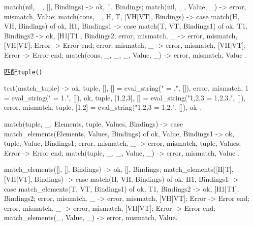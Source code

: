\documentclass[preview,multi,crop=false,border=1in,class=memoir]{standalone}
\begin{document}
\begin{preview-page}
\begin{SourceCode}
match({nil, _}, [], Bindings) ->
    {ok, [], Bindings};
match({nil, _}, Value, _) ->
    {error, {mismatch, Value}};
match({cons, _, H, T}, [VH|VT], Bindings) ->
    case match(H, VH, Bindings) of
        {ok, H1, Bindings1} ->
            case match(T, VT, Bindings1) of
                {ok, T1, Bindings2} ->
                    {ok, [H1|T1], Bindings2};
                {error, {mismatch, _}} ->
                    {error, {mismatch, [VH|VT]}};
                Error ->
                    Error
            end;
        {error, {mismatch, _}} ->
            {error, {mismatch, [VH|VT]}};
        Error ->
            Error
    end;
match({cons, _, _, _}, Value, _) ->
    {error, {mismatch, Value}}
.
\end{SourceCode}

匹配\verb|tuple()|

\begin{SourceCode}
test(match_tuple) ->
    {ok, {tuple, []}, []} = eval_string("{} = {}.", []),
    {error, {mismatch, 1}} = eval_string("{} = 1.", []),
    {ok, {tuple, [1,2,3]}, []} = eval_string("{1,2,3} = {1,2,3}.", []),
    {error, {mismatch, {tuple, [1,2]}}} = eval_string("{1,2,3} = {1,2}.", []),
    ok
.
\end{SourceCode}


\begin{SourceCode}
match({tuple, _, Elements}, {tuple, Values}, Bindings) ->
    case match_elements(Elements, Values, Bindings) of
        {ok, Value, Bindings1} ->
            {ok, {tuple, Value}, Bindings1};
        {error, {mismatch, _}} ->
            {error, {mismatch, {tuple, Values}}};
        Error ->
            Error
    end;
match({tuple, _, _}, Value, _) ->
    {error, {mismatch, Value}}
.
\end{SourceCode}


\begin{SourceCode}
match_elements([], [], Bindings) ->
    {ok, [], Bindings};
match_elements([H|T], [VH|VT], Bindings) ->
    case match(H, VH, Bindings) of
        {ok, H1, Bindings1} ->
            case match_elements(T, VT, Bindings1) of
                {ok, T1, Bindings2} ->
                    {ok, [H1|T1], Bindings2};
                {error, {mismatch, _}} ->
                    {error, {mismatch, [VH|VT]}};
                Error ->
                    Error
            end;
        {error, {mismatch, _}} ->
            {error, {mismatch, [VH|VT]}};
        Error ->
            Error
    end;
match_elements(_, Value, _) ->
    {error, {mismatch, Value}}.
\end{SourceCode}

\end{preview-page}
\end{document}

